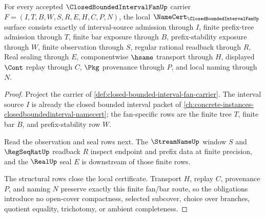 \begin{theorem}
\label{thm:closed-bounded-interval-fan-namecert-obligations}
For every accepted $\ClosedBoundedIntervalFanUp$ carrier $F=(I,T,B,W,S,R,E,H,C,P,N)$, the local $\NameCert_{\ClosedBoundedIntervalFanUp}$ surface consists exactly of interval-source admission through $I$, finite prefix-tree admission through $T$, finite bar exposure through $B$, prefix-stability exposure through $W$, finite observation through $S$, regular rational readback through $R$, Real sealing through $E$, componentwise $\hsame$ transport through $H$, displayed $\Cont$ replay through $C$, $\Pkg$ provenance through $P$, and local naming through $N$.
\end{theorem}
\begin{proof}
Project the carrier of \autoref{def:closed-bounded-interval-fan-carrier}. The interval source $I$ is already the closed bounded interval packet of \autoref{ch:concrete-instances-closedboundedinterval-namecert}; the fan-specific rows are the finite tree $T$, finite bar $B$, and prefix-stability row $W$.

Read the observation and seal rows next. The $\StreamNameUp$ window $S$ and $\RegSeqRatUp$ readback $R$ inspect endpoint and prefix data at finite precision, and the $\RealUp$ seal $E$ is downstream of those finite rows.

The structural rows close the local certificate. Transport $H$, replay $C$, provenance $P$, and naming $N$ preserve exactly this finite fan/bar route, so the obligations introduce no open-cover compactness, selected subcover, choice over branches, quotient equality, trichotomy, or ambient completeness.
\end{proof}

